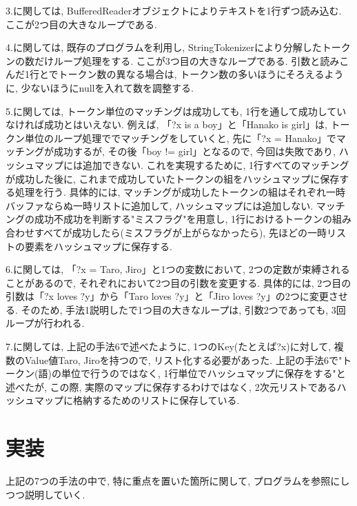 \documentclass[uplatex,12pt]{jsarticle}
\begin{document}
3.に関しては, BufferedReaderオブジェクトによりテキストを1行ずつ読み込む. ここが2つ目の大きなループである.

4.に関しては, 既存のプログラムを利用し, StringTokenizerにより分解したトークンの数だけループ処理をする. ここが3つ目の大きなループである. 引数と読みこんだ1行とでトークン数の異なる場合は, トークン数の多いほうにそろえるように, 少ないほうにnullを入れて数を調整する.

5.に関しては, トークン単位のマッチングは成功しても, 1行を通して成功していなければ成功とはいえない. 例えば, 「?x is a boy」と「Hanako is girl」は, トークン単位のループ処理ででマッチングをしていくと, 先に「?x = Hanako」でマッチングが成功するが, その後「boy != girl」となるので, 今回は失敗であり, ハッシュマップには追加できない. これを実現するために, 1行すべてのマッチングが成功した後に, これまで成功していたトークンの組をハッシュマップに保存する処理を行う. 具体的には, マッチングが成功したトークンの組はそれぞれ一時バッファならぬ一時リストに追加して, ハッシュマップには追加しない. マッチングの成功不成功を判断する"ミスフラグ"を用意し, 1行におけるトークンの組み合わせすべてが成功したら(ミスフラグが上がらなかったら), 先ほどの一時リストの要素をハッシュマップに保存する.

6.に関しては, 「?x = Taro, Jiro」と1つの変数において, 2つの定数が束縛されることがあるので, それぞれにおいて2つ目の引数を変更する. 具体的には, 2つ目の引数は「?x loves ?y」から「Taro loves ?y」と「Jiro loves ?y」の2つに変更させる. そのため, 手法1説明したで1つ目の大きなループは, 引数2つであっても, 3回ループが行われる.

7.に関しては, 上記の手法6で述べたように, 1つのKey(たとえば?x)に対して, 複数のValue値{Taro, Jiro}を持つので, リスト化する必要があった. 上記の手法6で"トークン(語)の単位で行うのではなく, 1行単位でハッシュマップに保存をする"と述べたが, この際, 実際のマップに保存するわけではなく, 2次元リストであるハッシュマップに格納するためのリストに保存している.

\section{実装}
上記の7つの手法の中で, 特に重点を置いた箇所に関して, プログラムを参照にしつつ説明していく.
\end{document}

